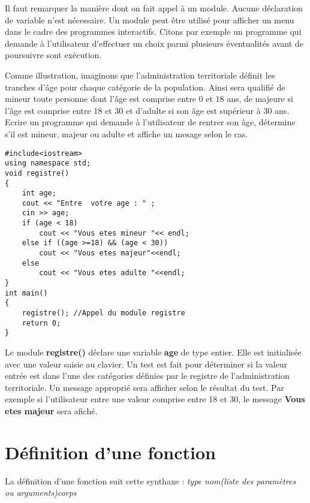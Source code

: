 \documentclass[a4paper, oneside,11pt]{book}
\begin{document}
Il faut remarquer la mani\`ere dont on fait appel \`a un module. Aucune d\'eclaration de variable n'est n\'ecessaire.  Un module peut \^etre utilis\'e pour afficher un menu dans 
le cadre des programmes interactifs. Citons par exemple un programme qui demande \`a l'utilisateur d'effectuer un choix parmi plusieurs \'eventualit\'es avant de poursuivre sont 
ex\'ecution. 

Comme illustration, imaginons que l'administration territoriale d\'efinit les tranches d'\^age pour chaque cat\'egorie de la population. Ainsi sera qualifi\'e de mineur toute personne
dont l'\^age est comprise entre 0 et 18 ans, de majeure si l'\^age est  comprise entre 18 et 30 et d'adulte si  son \^age est sup\'erieur \`a 30 ans. Ecrire un programme qui demande
\`a l'utilisateur de rentrer son \^age, d\'etermine s'il est mineur, majeur ou adulte et affiche un mesage selon le cas. 


\begin{lstlisting}
#include<iostream>
using namespace std;
void registre()
{
    int age;
    cout << "Entre  votre age : " ;
    cin >> age;
    if (age < 18)
        cout << "Vous etes mineur "<< endl;
    else if ((age >=18) && (age < 30))
        cout << "Vous etes majeur"<<endl;
    else
        cout << "Vous etes adulte "<<endl;
}
int main()
{
    registre(); //Appel du module registre
    return 0;
}
\end{lstlisting}
Le module \textbf{registre()} d\'eclare une variable \textbf{age} de type  entier. Elle est initialis\'ee avec une valeur saisie au clavier. Un test est fait pour d\'eterminer 
si la valeur entr\'ee est dans l'une des cat\'egories d\'efinies par le registre de l'administration territoriale. Un message appropri\'e sera afficher selon le r\'esultat du test.
Par exemple si l'utilisateur entre une valeur comprise entre 18 et 30, le message \textbf{Vous etes majeur} sera afich\'e.

\section{D\'efinition d'une fonction} \label{sec62} 

La d\'efinition d'une fonction suit cette synthaxe : \textit{type nom(liste des param\`etres ou arguments){corps}}
\end{document}
